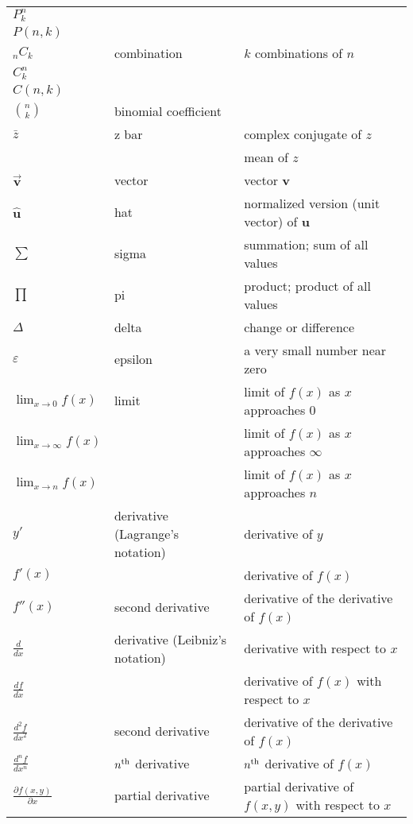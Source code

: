 \documentclass{article}
\begin{document}
\begin{longtable}{|| L{1.7cm} | L{3.5cm} | L{7cm} ||}
\(P^{n}_{k}\) & & \\
\(P(n,k)\) & & \\
\hline
\(_{n}C_{k}\) & combination & \(k\) combinations of \(n\)\\
\(C^{n}_{k}\) & & \\
\(C(n,k)\) & & \\
\(\binom{n}{k}\) & binomial coefficient & \\
\hline
\(\bar{z}\) & z bar & complex conjugate of \(z\)\\
& & mean of \(z\)\\
\hline
\(\vec{\textbf{v}}\) & vector & vector \textbf{v}\\
\hline
\(\hat{\textbf{u}}\) & hat & normalized version (unit vector) of \textbf{u}\\
\hline
\(\sum\) & sigma & summation; sum of all values\\
\hline
\(\prod\) & pi & product; product of all values\\
\hline
\(\Delta\) & delta & change or difference\\
\hline
\(\varepsilon\) & epsilon & a very small number near zero\\
\hline
\(\displaystyle{\lim_{x\to{0}} f(x)}\) & limit & limit of \(f(x)\) as \(x\) approaches 0\\
\(\displaystyle{\lim_{x\to{\infty}} f(x)}\) & & limit of \(f(x)\) as \(x\) approaches \(\infty\)\\
\(\displaystyle{\lim_{x\to{n}} f(x)}\) & & limit of \(f(x)\) as \(x\) approaches \(n\)\\
\hline
\(y'\) & derivative (Lagrange's notation) & derivative of \(y\)\\
\(f'(x)\) & & derivative of \(f(x)\)\\
\(f''(x)\) & second derivative & derivative of the derivative of \(f(x)\)\\
\hline
\(\frac{d}{dx}\) & derivative (Leibniz's notation) & derivative with respect to \(x\)\\
\(\frac{df}{dx}\) &  & derivative of \(f(x)\) with respect to \(x\)\\
\(\frac{d^{2}f}{dx^{2}}\) & second derivative & derivative of the derivative of \(f(x)\)\\
\(\frac{d^{n}f}{dx^{n}}\) & \(n\textsuperscript{th}\) derivative & \(n\textsuperscript{th}\) derivative of \(f(x)\)\\
\hline
\(\frac{\partial f(x,y)}{\partial x}\) & partial derivative & partial derivative of \(f(x,y)\) with respect to \(x\)\\

\end{longtable}
\end{document}
